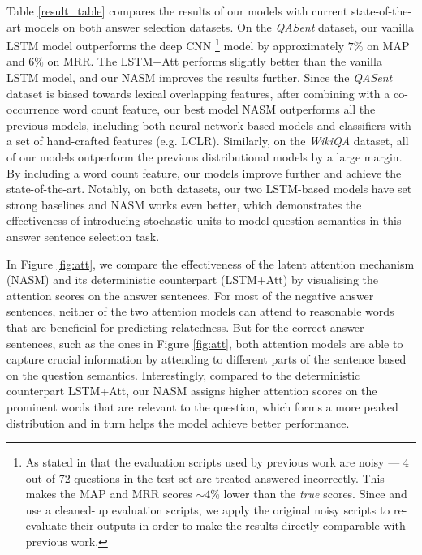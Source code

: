 \documentclass{article}
\begin{document}
Table \ref{result_table} compares the results of our models with current state-of-the-art models on both answer selection datasets. 
On the \textit{QASent} dataset, our vanilla LSTM model outperforms the deep CNN \footnote{As stated in \citep{yih2013question} that the evaluation scripts used by previous work are noisy --- 4 out of 72 questions in the test set are treated answered incorrectly. 
This makes the MAP and MRR scores $\sim4\%$ lower than the {\it true} scores. 
Since \citet{severyn2015disi} and \citet{wang2015faq} use a cleaned-up evaluation scripts, we apply the original noisy scripts to re-evaluate their outputs in order to make the results directly comparable with previous work. } model by approximately $7\%$ on MAP and $6\%$ on MRR. 
The LSTM+Att performs slightly better than the vanilla LSTM model, and our NASM improves the results further. 
Since the \textit{QASent} dataset is biased towards lexical overlapping features, after combining with a co-occurrence word count feature, our best model NASM outperforms all the previous models, including both neural network based models and classifiers with a set of hand-crafted features (e.g. LCLR). 
Similarly, on the \textit{WikiQA} dataset, all of our models outperform the previous distributional models by a large margin. 
By including a word count feature, our models improve further and achieve the state-of-the-art. 
Notably, on both datasets, our two LSTM-based models have set strong baselines and NASM works even better, which demonstrates the effectiveness of introducing stochastic units to model question semantics in this answer sentence selection task.

In Figure \ref{fig:att}, we compare the effectiveness of the latent attention mechanism (NASM) and its deterministic counterpart (LSTM+Att) by visualising the attention scores on the answer sentences. 
For most of the negative answer sentences, neither of the two attention models can attend to reasonable words that are beneficial for predicting relatedness. 
But for the correct answer sentences, such as the ones in Figure \ref{fig:att}, both attention models are able to capture crucial information by attending to different parts of the sentence based on the question semantics. 
Interestingly, compared to the deterministic counterpart LSTM+Att, our NASM assigns higher attention scores on the prominent words that are relevant to the question, which forms a more peaked distribution and in turn helps the model achieve better performance. 
\end{document}
